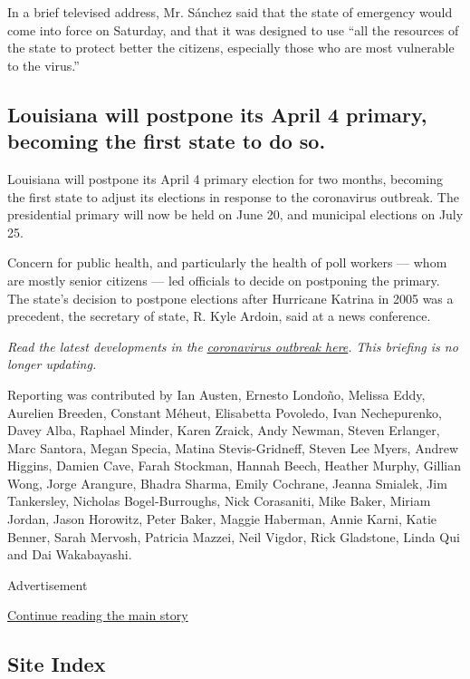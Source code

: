 In a brief televised address, Mr. Sánchez said that the state of
emergency would come into force on Saturday, and that it was designed to
use ``all the resources of the state to protect better the citizens,
especially those who are most vulnerable to the virus.''

\hypertarget{louisiana-will-postpone-its-april-4-primary-becoming-the-first-state-to-do-so}{%
\subsection{Louisiana will postpone its April 4 primary, becoming the
first state to do
so.}\label{louisiana-will-postpone-its-april-4-primary-becoming-the-first-state-to-do-so}}

Louisiana will postpone its April 4 primary election for two months,
becoming the first state to adjust its elections in response to the
coronavirus outbreak. The presidential primary will now be held on June
20, and municipal elections on July 25.

Concern for public health, and particularly the health of poll workers
--- whom are mostly senior citizens --- led officials to decide on
postponing the primary. The state's decision to postpone elections after
Hurricane Katrina in 2005 was a precedent, the secretary of state, R.
Kyle Ardoin, said at a news conference.

\emph{Read the latest developments in the}
\href{https://www.nytimes3xbfgragh.onion/2020/03/14/world/coronavirus-news.html}{\emph{coronavirus
outbreak here}}\emph{.} \emph{This briefing is no longer updating.}

Reporting was contributed by Ian Austen, Ernesto Londoño, Melissa Eddy,
Aurelien Breeden, Constant Méheut, Elisabetta Povoledo, Ivan
Nechepurenko, Davey Alba, Raphael Minder, Karen Zraick, Andy Newman,
Steven Erlanger, Marc Santora, Megan Specia, Matina Stevis-Gridneff,
Steven Lee Myers, Andrew Higgins, Damien Cave, Farah Stockman, Hannah
Beech, Heather Murphy, Gillian Wong, Jorge Arangure, Bhadra Sharma,
Emily Cochrane, Jeanna Smialek, Jim Tankersley, Nicholas
Bogel-Burroughs, Nick Corasaniti, Mike Baker, Miriam Jordan, Jason
Horowitz, Peter Baker, Maggie Haberman, Annie Karni, Katie Benner, Sarah
Mervosh, Patricia Mazzei, Neil Vigdor, Rick Gladstone, Linda Qui and Dai
Wakabayashi.

Advertisement

\protect\hyperlink{after-bottom}{Continue reading the main story}

\hypertarget{site-index}{%
\subsection{Site Index}\label{site-index}}


